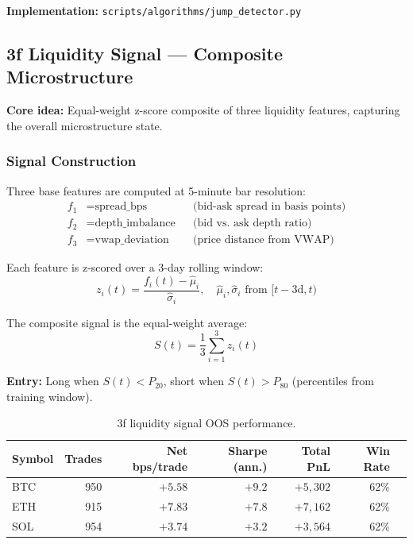 \documentclass[11pt,a4paper]{article}
\newcommand{\toprule}{\hline\hline}
\newcommand{\midrule}{\hline}
\newcommand{\bottomrule}{\hline\hline}
\begin{document}
\textbf{Implementation:} \texttt{scripts/algorithms/jump\_detector.py}

\subsection{3f Liquidity Signal --- Composite Microstructure}

\textbf{Core idea:} Equal-weight z-score composite of three liquidity features, capturing the overall microstructure state.

\subsubsection*{Signal Construction}

Three base features are computed at 5-minute bar resolution:
\begin{align}
f_1 &= \text{spread\_bps} && \text{(bid-ask spread in basis points)} \\
f_2 &= \text{depth\_imbalance} && \text{(bid vs.\ ask depth ratio)} \\
f_3 &= \text{vwap\_deviation} && \text{(price distance from VWAP)}
\end{align}

Each feature is z-scored over a 3-day rolling window:
\begin{equation}
z_i(t) = \frac{f_i(t) - \hat{\mu}_i}{\hat{\sigma}_i}, \quad \hat{\mu}_i, \hat{\sigma}_i \text{ from } [t - 3\text{d}, t)
\end{equation}

The composite signal is the equal-weight average:
\begin{equation}
S(t) = \frac{1}{3}\sum_{i=1}^{3} z_i(t)
\end{equation}

\textbf{Entry:} Long when $S(t) < P_{20}$, short when $S(t) > P_{80}$ (percentiles from training window).

\begin{table}[h!]
\centering
\caption{3f liquidity signal OOS performance.}
\begin{tabular}{@{}lrrrrrr@{}}
\toprule
Symbol & Trades & Net bps/trade & Sharpe (ann.) & Total PnL & Win Rate \\
\midrule
BTC & 950 & $+5.58$ & $+9.2$ & $+5{,}302$ & 62\% \\
ETH & 915 & $+7.83$ & $+7.8$ & $+7{,}162$ & 62\% \\
SOL & 954 & $+3.74$ & $+3.2$ & $+3{,}564$ & 62\% \\
\bottomrule
\end{tabular}
\end{table}
\end{document}
